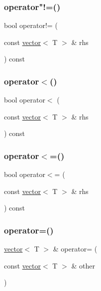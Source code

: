\mbox{\label{classvector_ac89b6dd8e249534db8f28a2c34ece842}} 
\subsubsection{\texorpdfstring{operator"!=()}{operator!=()}}
{\footnotesize\ttfamily bool operator!= (\begin{DoxyParamCaption}\item[{const \mbox{\hyperlink{classvector}{vector}}$<$ T $>$ \&}]{rhs }\end{DoxyParamCaption}) const}

\mbox{\label{classvector_a6b8e2532dd091d49a19ad5a92fa88742}} 
\subsubsection{\texorpdfstring{operator$<$()}{operator<()}}
{\footnotesize\ttfamily bool operator$<$ (\begin{DoxyParamCaption}\item[{const \mbox{\hyperlink{classvector}{vector}}$<$ T $>$ \&}]{rhs }\end{DoxyParamCaption}) const}

\mbox{\label{classvector_a760a0ad79cdf6a459e2641ddb9a54c3a}} 
\subsubsection{\texorpdfstring{operator$<$=()}{operator<=()}}
{\footnotesize\ttfamily bool operator$<$= (\begin{DoxyParamCaption}\item[{const \mbox{\hyperlink{classvector}{vector}}$<$ T $>$ \&}]{rhs }\end{DoxyParamCaption}) const}

\mbox{\label{classvector_ab0f8c3adc54f26c30db3a913daed81af}} 
\subsubsection{\texorpdfstring{operator=()}{operator=()}\hspace{0.1cm}{\footnotesize\ttfamily [1/3]}}
{\footnotesize\ttfamily \mbox{\hyperlink{classvector}{vector}}$<$ T $>$ \& operator= (\begin{DoxyParamCaption}\item[{const \mbox{\hyperlink{classvector}{vector}}$<$ T $>$ \&}]{other }\end{DoxyParamCaption})}

